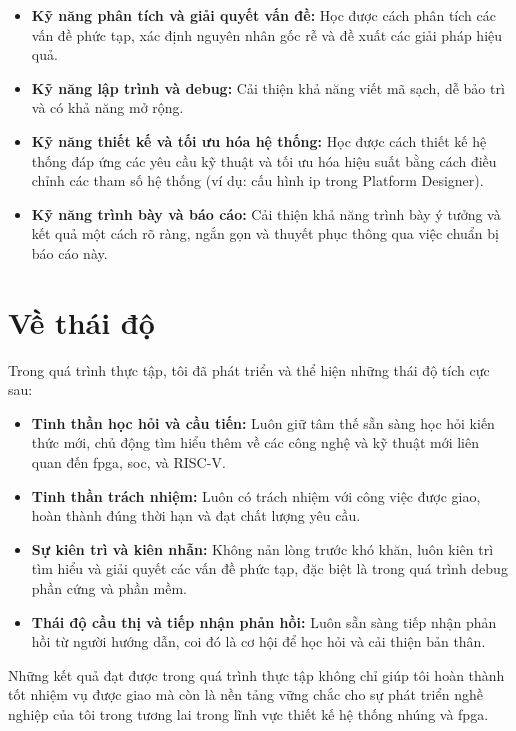 \begin{itemize}
    \item \textbf{Kỹ năng phân tích và giải quyết vấn đề:} Học được cách phân tích các vấn đề phức tạp, xác định nguyên nhân gốc rễ và đề xuất các giải pháp hiệu quả.
    \item \textbf{Kỹ năng lập trình và debug:} Cải thiện khả năng viết mã sạch, dễ bảo trì và có khả năng mở rộng.
    \item \textbf{Kỹ năng thiết kế và tối ưu hóa hệ thống:} Học được cách thiết kế hệ thống đáp ứng các yêu cầu kỹ thuật và tối ưu hóa hiệu suất bằng cách điều chỉnh các tham số hệ thống (ví dụ: cấu hình \acrshort{ip} trong Platform Designer). 
    \item \textbf{Kỹ năng trình bày và báo cáo:} Cải thiện khả năng trình bày ý tưởng và kết quả một cách rõ ràng, ngắn gọn và thuyết phục thông qua việc chuẩn bị báo cáo này. 
\end{itemize}

\section{Về thái độ} 
\label{sec:attitude_developed}

Trong quá trình thực tập, tôi đã phát triển và thể hiện những thái độ tích cực sau:
\begin{itemize}
    \item \textbf{Tinh thần học hỏi và cầu tiến:} Luôn giữ tâm thế sẵn sàng học hỏi kiến thức mới, chủ động tìm hiểu thêm về các công nghệ và kỹ thuật mới liên quan đến \acrshort{fpga}, \acrshort{soc}, và RISC-V.
    \item \textbf{Tinh thần trách nhiệm:} Luôn có trách nhiệm với công việc được giao, hoàn thành đúng thời hạn và đạt chất lượng yêu cầu.
    \item \textbf{Sự kiên trì và kiên nhẫn:} Không nản lòng trước khó khăn, luôn kiên trì tìm hiểu và giải quyết các vấn đề phức tạp, đặc biệt là trong quá trình debug phần cứng và phần mềm.
    \item \textbf{Thái độ cầu thị và tiếp nhận phản hồi:} Luôn sẵn sàng tiếp nhận phản hồi từ người hướng dẫn, coi đó là cơ hội để học hỏi và cải thiện bản thân.
\end{itemize}

Những kết quả đạt được trong quá trình thực tập không chỉ giúp tôi hoàn thành tốt nhiệm vụ được giao mà còn là nền tảng vững chắc cho sự phát triển nghề nghiệp của tôi trong tương lai trong lĩnh vực thiết kế hệ thống nhúng và \acrshort{fpga}. 